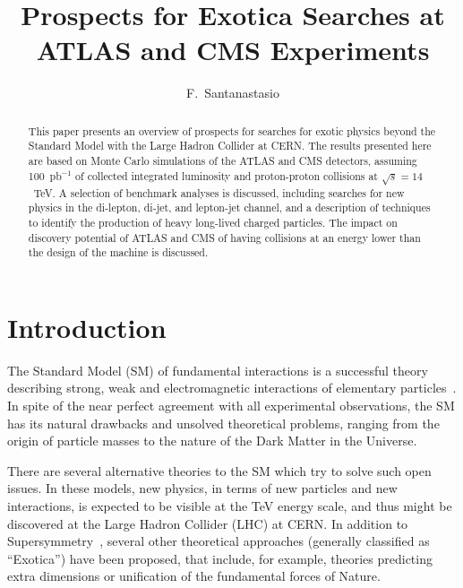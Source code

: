\documentclass{cimento}
\title{Prospects for Exotica Searches at ATLAS and CMS Experiments}
\author{F.~Santanastasio\from{ins:UMD}\ETC
}
\begin{document}
\maketitle

\begin{abstract}
    This paper presents an overview of prospects for searches for exotic physics 
    beyond the Standard Model with the Large Hadron Collider at CERN. 
    The results presented here are based on Monte Carlo simulations of the
    ATLAS and CMS detectors, assuming 100~pb$^{-1}$ of collected integrated 
    luminosity and proton-proton collisions 
    at $\sqrt{s} = 14$~TeV. A selection of benchmark analyses is discussed, 
    including searches for new physics in the di-lepton, di-jet, and lepton-jet channel, 
    and a description of techniques to identify the production of 
    heavy long-lived charged particles. 
    The impact on discovery potential of ATLAS and CMS  
    of having collisions at an energy lower than the design of the machine 
    is discussed.
\end{abstract}



\section{Introduction}
The Standard Model (SM) of fundamental interactions is a successful theory 
describing strong, weak and electromagnetic interactions of elementary 
particles~\cite{Weinberg:1979pi}. 
In spite of the near perfect agreement with all experimental 
observations, the SM has its natural drawbacks and unsolved theoretical 
problems, ranging from the origin of particle masses to the nature of the 
Dark Matter in the Universe.

There are several alternative theories to the SM which try to solve such 
open issues. In these models, new physics, in terms of new particles and 
new interactions, is expected to be visible at the TeV energy scale, and 
thus might be discovered at the Large Hadron Collider (LHC) at CERN.
In addition to Supersymmetry~\cite{Martin:1997ns}, 
several other theoretical approaches 
(generally classified as ``Exotica'') have been proposed, 
that include, for example, theories predicting extra dimensions or 
unification of the fundamental forces of Nature.
\end{document}
